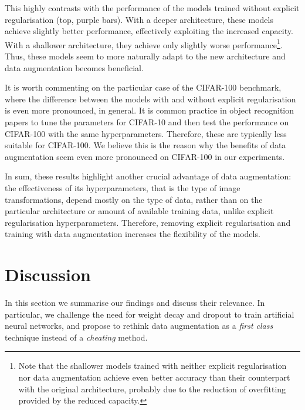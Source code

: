 {This highly contrasts with the performance of the models trained without explicit regularisation (top, purple bars). With a deeper architecture, these models achieve slightly better performance, effectively exploiting the increased capacity. With a shallower architecture, they achieve only slightly worse performance\footnote{Note that the shallower models trained with neither explicit regularisation nor data augmentation achieve even better accuracy than their counterpart with the original architecture, probably due to the reduction of overfitting provided by the reduced capacity.}. Thus, these models seem to more naturally adapt to the new architecture and data augmentation becomes beneficial.

It is worth commenting on the particular case of the CIFAR-100 benchmark, where the difference between the models with and without explicit regularisation is even more pronounced, in general. It is common practice in object recognition papers to tune the parameters for CIFAR-10 and then test the performance on CIFAR-100 with the same hyperparameters. Therefore, these are typically less suitable for CIFAR-100. We believe this is the reason why the benefits of data augmentation seem even more pronounced on CIFAR-100 in our experiments.

In sum, these results highlight another crucial advantage of data augmentation: the effectiveness of its hyperparameters, that is the type of image transformations, depend mostly on the type of data, rather than on the particular architecture or amount of available training data, unlike explicit regularisation hyperparameters. Therefore, removing explicit regularisation and training with data augmentation increases the flexibility of the models.

\section{Discussion}
\label{sec:daugreg-discussion}
In this section we summarise our findings and discuss their relevance. In particular, we challenge the need for weight decay and dropout to train artificial neural networks, and propose to rethink data augmentation as a \textit{first class} technique instead of a \textit{cheating} method.

}
